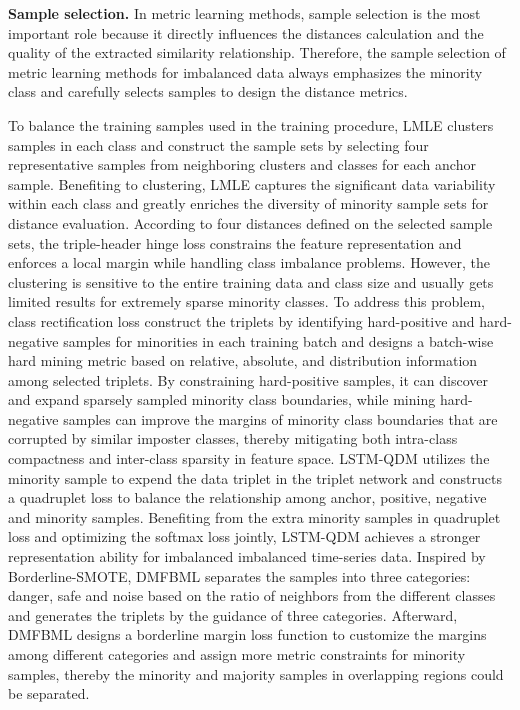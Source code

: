 \textbf{Sample selection.}
In metric learning methods, sample selection is the most important role because it directly influences the distances calculation and the quality of the extracted similarity relationship. Therefore, the sample selection of metric learning methods for imbalanced data always emphasizes the minority class \cite{huang2016learning, dong2017class, wang2018iterative, gui2022quadruplet, yan2023borderline} and carefully selects samples to design the distance metrics.  

To balance the training samples used in the training procedure, LMLE \cite{huang2016learning} clusters samples in each class and construct the sample sets by selecting four representative samples from neighboring clusters and classes for each anchor sample. Benefiting to clustering, LMLE captures the significant data variability within each class and greatly enriches the diversity of minority sample sets for distance evaluation. According to four distances defined on the selected sample sets, the triple-header hinge loss constrains the feature representation and enforces a local margin while handling class imbalance problems. 
However, the clustering is sensitive to the entire training data and class size and usually gets limited results for extremely sparse minority classes. 
To address this problem, class rectification loss \cite{dong2017class} construct the triplets by identifying hard-positive and hard-negative samples for minorities in each training batch and designs a batch-wise hard mining metric based on relative, absolute, and distribution information among selected triplets. By constraining hard-positive samples, it can discover and expand sparsely sampled minority class boundaries, while mining hard-negative samples can improve the margins of minority class boundaries that are corrupted by similar imposter classes, thereby mitigating both intra-class compactness and inter-class sparsity in feature space.
LSTM-QDM \cite{gui2022quadruplet} utilizes the minority sample to expend the data triplet in the triplet network \cite{cheng2016person} and constructs a quadruplet loss to balance the relationship among anchor, positive, negative and minority samples. Benefiting from the extra minority samples in quadruplet loss and optimizing the softmax loss jointly, LSTM-QDM achieves a stronger representation ability for imbalanced imbalanced time-series data.
Inspired by Borderline-SMOTE, DMFBML \cite{yan2023borderline} separates the samples into three categories: danger, safe and noise based on the ratio of neighbors from the different classes and generates the triplets by the guidance of three categories. 
Afterward, DMFBML designs a borderline margin loss function to customize the margins among different categories and assign more metric constraints for minority samples, thereby the minority and majority samples in overlapping regions could be separated.

